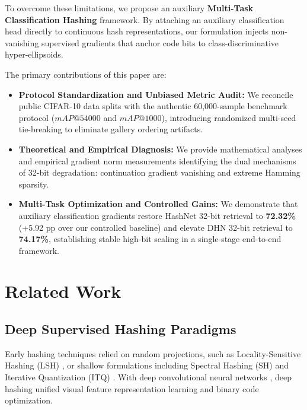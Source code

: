 \documentclass[10pt,conference]{IEEEtran}
\begin{document}
To overcome these limitations, we propose an auxiliary \textbf{Multi-Task Classification Hashing} framework. By attaching an auxiliary classification head directly to continuous hash representations, our formulation injects non-vanishing supervised gradients that anchor code bits to class-discriminative hyper-ellipsoids.

The primary contributions of this paper are:
\begin{itemize}
    \item \textbf{Protocol Standardization and Unbiased Metric Audit:} We reconcile public CIFAR-10 data splits with the authentic 60,000-sample benchmark protocol ($mAP@54000$ and $mAP@1000$), introducing randomized multi-seed tie-breaking to eliminate gallery ordering artifacts.
    \item \textbf{Theoretical and Empirical Diagnosis:} We provide mathematical analyses and empirical gradient norm measurements identifying the dual mechanisms of 32-bit degradation: continuation gradient vanishing and extreme Hamming sparsity.
    \item \textbf{Multi-Task Optimization and Controlled Gains:} We demonstrate that auxiliary classification gradients restore HashNet 32-bit retrieval to \textbf{72.32\%} (+5.92 pp over our controlled baseline) and elevate DHN 32-bit retrieval to \textbf{74.17\%}, establishing stable high-bit scaling in a single-stage end-to-end framework.
\end{itemize}

\section{Related Work}

\subsection{Deep Supervised Hashing Paradigms}
Early hashing techniques relied on random projections, such as Locality-Sensitive Hashing (LSH) \cite{gionis1999similarity}, or shallow formulations including Spectral Hashing (SH) \cite{weiss2008spectral} and Iterative Quantization (ITQ) \cite{gong2012iterative}. With deep convolutional neural networks \cite{krizhevsky2012imagenet}, deep hashing unified visual feature representation learning and binary code optimization.
\end{document}
